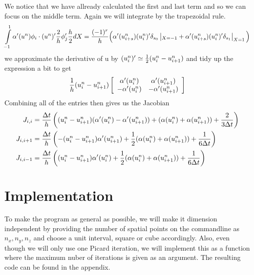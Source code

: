 \documentclass[a4paper,english, 10pt, twoside]{article}
\begin{document}
We notice that we have allready calculated the first and last term and so we can focus on the middle term. Again we will integrate by the trapezoidal rule.
\begin{align*}
 \int\limits_{-1}^1\alpha'(u^n)\phi_i\cdot(u^n)'{2\over h}\phi'_j{h\over2}dX  = {(-1)^r\over h}\Big(\alpha'(u_{i+s}^n)(u_i^n)'\delta_{s_0}\left|_{X=-1} +
 \alpha'(u_{i+s}^n)(u_i^n)'\delta_{s_1}\right|_{X=1}\Big) 
\end{align*}
we approximate the derivative of u by $(u^n_i)' \simeq {1\over2}(u^n_i-u^n_{i+1})$ and tidy up the expression a bit to get
\begin{align*}
 {1\over h}(u^n_i-u^n_{i+1})\left[
 \begin{array}{c c}
  \alpha'(u^n_i) & \alpha'(u^n_{i+1})\\
  -\alpha'(u^n_i) & -\alpha'(u^n_{i+1})
 \end{array}
\right]
\end{align*}
Combining all of the entries then gives us the Jacobian
\begin{align*}
 J_{i,i} &= {\Delta t\over h}\left((u^n_i-u^n_{i+1})(\alpha'(u^n_i)-\alpha'(u^n_{i+1})) +(\alpha(u^n_i)+\alpha(u^n_{i+1}))+{2\over3\Delta t} \right)\\
 J_{i,i+1} &=  {\Delta t\over h}\left(-(u^n_i-u^n_{i+1})\alpha'(u^n_{i+1}) +{1\over2}(\alpha(u^n_i)+\alpha(u^n_{i+1}))+{1\over6\Delta t}\right)\\
 J_{i,i-1} &=  {\Delta t\over h}\left((u^n_i-u^n_{i+1})\alpha'(u^n_{i}) +{1\over2}(\alpha(u^n_i)+\alpha(u^n_{i+1}))+{1\over6\Delta t}\right)
\end{align*}


\section{Implementation}
To make the program as general as possible, we will make it dimension independent by providing the number of spatial points on the commandline 
as $n_x, n_y, n_z$ and choose a unit interval, square or cube accordingly. Also, even though we will only use one Picard iteration, we will 
implement this as a function where the maximum nuber of iterations is given as an argument. The resulting code can be found in the appendix.
\end{document}
